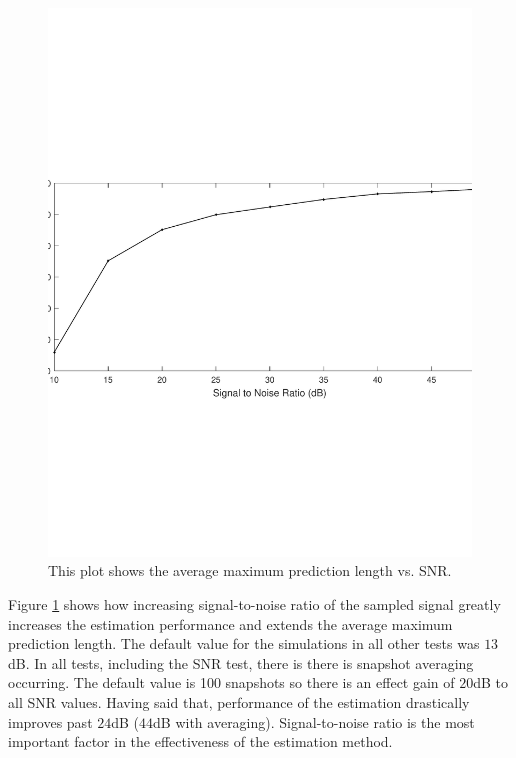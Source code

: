 \documentclass{allertonproc}
\begin{document}
\begin{figure}[tbp]
\begin{center}
\includegraphics[width=6in]{signalToNoise}
\caption{This plot shows the average maximum prediction length vs. SNR. }\label{SNR}
\end{center}
\end{figure}
Figure \ref{SNR} shows how increasing signal-to-noise ratio of the sampled signal greatly increases the estimation performance and extends the average maximum prediction length. The default value for the simulations in all other tests was $13$dB. In all tests, including the SNR test, there is there is snapshot averaging occurring. The default value is 100 snapshots so there is an effect gain of $20$dB to all SNR values. Having said that, performance of the estimation drastically improves past $24$dB ($44$dB with averaging). Signal-to-noise ratio is the most important factor in the effectiveness of the estimation method.
\end{document}
